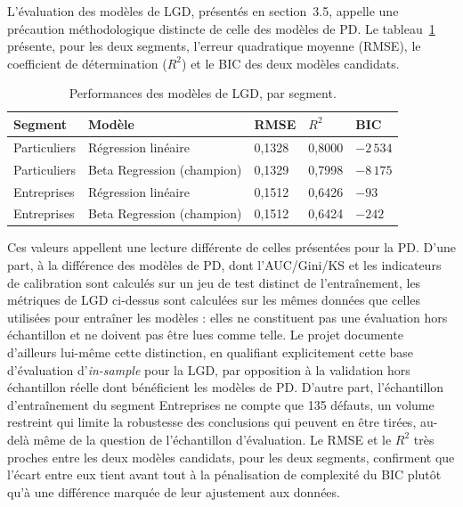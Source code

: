 L'évaluation des modèles de LGD, présentés en section~3.5, appelle une précaution méthodologique distincte de celle des modèles de PD. Le tableau~\ref{tab:performance-lgd} présente, pour les deux segments, l'erreur quadratique moyenne (RMSE), le coefficient de détermination ($R^2$) et le BIC des deux modèles candidats.

\begin{table}[htbp]
    \centering
    \footnotesize
    \caption{Performances des modèles de LGD, par segment.}
    \label{tab:performance-lgd}
    \begin{tabular}{p{2.4cm}p{3.2cm}p{1.8cm}p{1.8cm}p{2cm}}
        \toprule
        \textbf{Segment} & \textbf{Modèle} & \textbf{RMSE} & \textbf{$R^2$} & \textbf{BIC} \\
        \midrule
        Particuliers & Régression linéaire & 0,1328 & 0,8000 & $-2\,534$ \\
        Particuliers & Beta Regression (champion) & 0,1329 & 0,7998 & $-8\,175$ \\
        \addlinespace
        Entreprises & Régression linéaire & 0,1512 & 0,6426 & $-93$ \\
        Entreprises & Beta Regression (champion) & 0,1512 & 0,6424 & $-242$ \\
        \bottomrule
    \end{tabular}
\end{table}

Ces valeurs appellent une lecture différente de celles présentées pour la PD. D'une part, à la différence des modèles de PD, dont l'AUC/Gini/KS et les indicateurs de calibration sont calculés sur un jeu de test distinct de l'entraînement, les métriques de LGD ci-dessus sont calculées sur les mêmes données que celles utilisées pour entraîner les modèles : elles ne constituent pas une évaluation hors échantillon et ne doivent pas être lues comme telle. Le projet documente d'ailleurs lui-même cette distinction, en qualifiant explicitement cette base d'évaluation d'\emph{in-sample} pour la LGD, par opposition à la validation hors échantillon réelle dont bénéficient les modèles de PD. D'autre part, l'échantillon d'entraînement du segment Entreprises ne compte que 135 défauts, un volume restreint qui limite la robustesse des conclusions qui peuvent en être tirées, au-delà même de la question de l'échantillon d'évaluation. Le RMSE et le $R^2$ très proches entre les deux modèles candidats, pour les deux segments, confirment que l'écart entre eux tient avant tout à la pénalisation de complexité du BIC plutôt qu'à une différence marquée de leur ajustement aux données.


